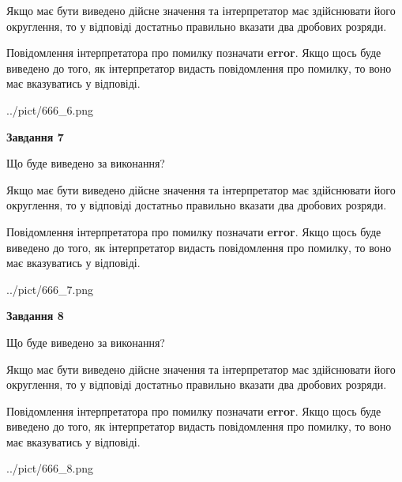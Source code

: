 \documentclass[12pt, ukrainian]{article}
\begin{document}
{\begin {Large}
Якщо має бути виведено дійсне значення та інтерпретатор має здійснювати його округлення, 
то у відповіді достатньо правильно вказати два дробових розряди.

Повідомлення інтерпретатора про помилку позначати \textbf{error}.
Якщо щось буде виведено до того, як інтерпретатор видасть повідомлення про помилку, 
то воно має вказуватись у відповіді. \par

\begin{center}
	{../pict/666_6.png}
\end{center}
\newpage

{\begin {center}\textbf{Завдання 7}\end {center}}\par
Що буде виведено за виконання? \par

Якщо має бути виведено дійсне значення та інтерпретатор має здійснювати його округлення, 
то у відповіді достатньо правильно вказати два дробових розряди.

Повідомлення інтерпретатора про помилку позначати \textbf{error}.
Якщо щось буде виведено до того, як інтерпретатор видасть повідомлення про помилку, 
то воно має вказуватись у відповіді. \par

\begin{center}
	{../pict/666_7.png}
\end{center}
\newpage

{\begin {center}\textbf{Завдання 8}\end {center}}\par
Що буде виведено за виконання? \par

Якщо має бути виведено дійсне значення та інтерпретатор має здійснювати його округлення, 
то у відповіді достатньо правильно вказати два дробових розряди.

Повідомлення інтерпретатора про помилку позначати \textbf{error}.
Якщо щось буде виведено до того, як інтерпретатор видасть повідомлення про помилку, 
то воно має вказуватись у відповіді. \par

\begin{center}
	{../pict/666_8.png}
\end{center}
\newpage


\end{Large}}
\end{document}
